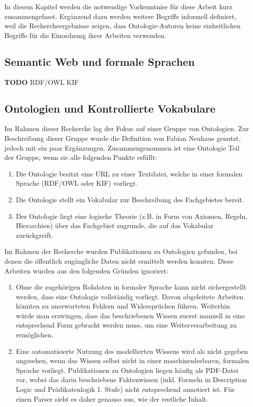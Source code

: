 \documentclass{article}
\begin{document}
In diesem Kapitel werden die notwendige Vorkenntnise für diese Arbeit kurz zusammengefasst.
Ergänzend dazu werden weitere Begriffe informell definiert, weil die Rechercheergebnisse zeigen, dass Ontologie-Autoren keine einheitlichen Begriffe für die Einordnung ihrer Arbeiten verwenden.

\subsection{Semantic Web und formale Sprachen}

\textbf{TODO}
RDF/OWL
KIF

\subsection{Ontologien und Kontrollierte Vokabulare}

Im Rahmen dieser Recherche lag der Fokus auf einer Gruppe von Ontologien.
Zur Beschreibung dieser Gruppe wurde die Definition von Fabian Neuhaus \cite{neuhaus2018ontology} genutzt, jedoch mit ein paar Ergänzungen.
Zusammengenommen ist eine Ontologie Teil der Gruppe, wenn sie alle folgenden Punkte erfüllt:

\begin{enumerate}
    \item Die Ontologie besitzt eine URL zu einer Textdatei, welche in einer formalen Sprache (RDF/OWL oder KIF) vorliegt.
    \item Die Ontologie stellt ein Vokabular zur Beschreibung des Fachgebietes bereit.
    \item Der Ontologie liegt eine logische Theorie (z.B. in Form von Axiomen, Regeln, Hierarchien) über das Fachgebiet zugrunde, die auf das Vokabular zurückgreift.
\end{enumerate}

Im Rahmen der Recherche wurden Publikationen zu Ontologien gefunden, bei denen die öffentlich zugängliche Daten nicht ermittelt werden konnten.
Diese Arbeiten wurden aus den folgenden Gründen ignoriert:
\begin{enumerate}
    \item Ohne die zugehörigen Rohdaten in formaler Sprache kann nicht sichergestellt werden, dass eine Ontologie vollständig vorliegt. Davon abgeleitete Arbeiten könnten zu unerwarteten Fehlern und Widersprüchen führen. Weiterhin würde man erzwingen, dass das beschriebenen Wissen zuerst manuell in eine entsprechend Form gebracht werden muss, um eine Weiterverarbeitung zu ermöglichen.
    \item Eine automatisierte Nutzung des modellierten Wissens wird als nicht gegeben angesehen, wenn das Wissen selbst nicht in einer maschinenlesbaren, formalen Sprache vorliegt. Publikationen zu Ontologien liegen häufig als PDF-Datei vor, wobei das darin beschriebene Faktenwissen (inkl. Formeln in Description Logic und Prädikatenlogik 1. Stufe) nicht entsprechend annotiert ist. Für einen Parser sieht es daher genauso aus, wie der restliche Inhalt.
\end{enumerate}
\end{document}
